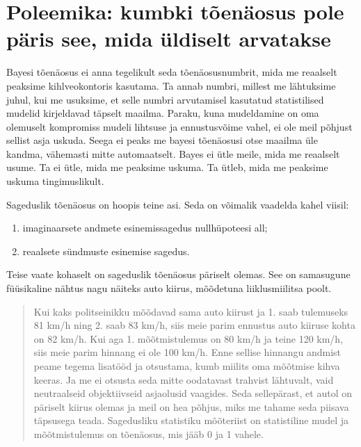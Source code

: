 \documentclass[]{book}
\begin{document}
\hypertarget{poleemika-kumbki-toenaosus-pole-paris-see-mida-uldiselt-arvatakse}{%
\section*{Poleemika: kumbki tõenäosus pole päris see, mida üldiselt arvatakse}\label{poleemika-kumbki-toenaosus-pole-paris-see-mida-uldiselt-arvatakse}}

Bayesi tõenäosus ei anna tegelikult seda tõenäosusnumbrit, mida me reaalselt peaksime kihlveokontoris kasutama.
Ta annab numbri, millest me lähtuksime juhul, kui me usuksime, et selle numbri arvutamisel kasutatud statistilised mudelid kirjeldavad täpselt maailma.
Paraku, kuna mudeldamine on oma olemuselt kompromiss mudeli lihtsuse ja ennustusvõime vahel, ei ole meil põhjust sellist asja uskuda.
Seega ei peaks me bayesi tõenäosusi otse maailma üle kandma, vähemasti mitte automaatselt.
Bayes ei ütle meile, mida me reaalselt usume.
Ta ei ütle, mida me peaksime uskuma. Ta ütleb, mida me peaksime uskuma tingimuslikult.

Sageduslik tõenäosus on hoopis teine asi.
Seda on võimalik vaadelda kahel viisil:

\begin{enumerate}
\def\labelenumi{\arabic{enumi}.}
\item
  imaginaarsete andmete esinemissagedus nullhüpoteesi all;
\item
  reaalsete sündmuste esinemise sagedus.
\end{enumerate}

Teise vaate kohaselt on sageduslik tõenäosus päriselt olemas. See on samasugune füüsikaline nähtus nagu näiteks auto kiirus, mõõdetuna liiklusmiilitsa poolt.

\begin{quote}
Kui kaks politseinikku mõõdavad sama auto kiirust ja 1. saab tulemuseks 81 km/h ning 2. saab 83 km/h, siis meie parim ennustus auto kiiruse kohta on 82 km/h. Kui aga 1. mõõtmistulemus on 80 km/h ja teine 120 km/h, siis meie parim hinnang ei ole 100 km/h. Enne sellise hinnangu andmist peame tegema lisatööd ja otsustama, kumb miilits oma mõõtmise kihva keeras. Ja me ei otsusta seda mitte oodatavast trahvist lähtuvalt, vaid neutraalseid objektiivseid asjaolusid vaagides. Seda sellepärast, et autol on päriselt kiirus olemas ja meil on hea põhjus, miks me tahame seda piisava täpsusega teada. Sagedusliku statistiku mõõteriist on statistiline mudel ja mõõtmistulemus on tõenäosus, mis jääb 0 ja 1 vahele.
\end{quote}
\end{document}
